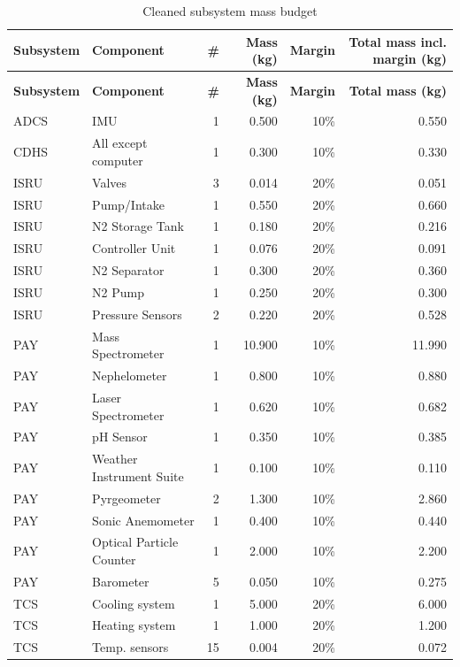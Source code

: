 \begin{longtable}{llrrrr}
\caption{Cleaned subsystem mass budget} \\
\hline
\textbf{Subsystem} & \textbf{Component} & \textbf{\#} & \textbf{Mass (kg)} & \textbf{Margin} & \textbf{Total mass incl. margin (kg)} \\
\hline
\endfirsthead

\hline
\textbf{Subsystem} & \textbf{Component} & \textbf{\#} & \textbf{Mass (kg)} & \textbf{Margin} & \textbf{Total mass (kg)} \\
\hline
\endhead

ADCS & IMU & 1 & 0.500 & 10\% & 0.550 \\
CDHS & All except computer & 1 & 0.300 & 10\% & 0.330 \\
\hline

ISRU & Valves & 3 & 0.014 & 20\% & 0.051 \\
ISRU & Pump/Intake & 1 & 0.550 & 20\% & 0.660 \\
ISRU & N2 Storage Tank & 1 & 0.180 & 20\% & 0.216 \\
ISRU & Controller Unit & 1 & 0.076 & 20\% & 0.091 \\
ISRU & N2 Separator & 1 & 0.300 & 20\% & 0.360 \\
ISRU & N2 Pump & 1 & 0.250 & 20\% & 0.300 \\
ISRU & Pressure Sensors & 2 & 0.220 & 20\% & 0.528 \\
\hline

PAY & Mass Spectrometer & 1 & 10.900 & 10\% & 11.990 \\
PAY & Nephelometer & 1 & 0.800 & 10\% & 0.880 \\
PAY & Laser Spectrometer & 1 & 0.620 & 10\% & 0.682 \\
PAY & pH Sensor & 1 & 0.350 & 10\% & 0.385 \\
PAY & Weather Instrument Suite & 1 & 0.100 & 10\% & 0.110 \\
PAY & Pyrgeometer & 2 & 1.300 & 10\% & 2.860 \\
PAY & Sonic Anemometer & 1 & 0.400 & 10\% & 0.440 \\
PAY & Optical Particle Counter & 1 & 2.000 & 10\% & 2.200 \\
PAY & Barometer & 5 & 0.050 & 10\% & 0.275 \\
\hline

TCS & Cooling system & 1 & 5.000 & 20\% & 6.000 \\
TCS & Heating system & 1 & 1.000 & 20\% & 1.200 \\
TCS & Temp. sensors & 15 & 0.004 & 20\% & 0.072 \\
\hline


\end{longtable}
